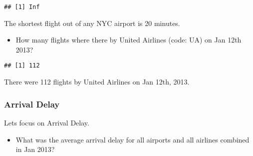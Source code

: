 \documentclass[
]{article}
\newenvironment{Shaded}{\begin{snugshade}}{\end{snugshade}}
\newcommand{\DataTypeTok}[1]{\textcolor[rgb]{0.13,0.29,0.53}{#1}}
\newcommand{\KeywordTok}[1]{\textcolor[rgb]{0.13,0.29,0.53}{\textbf{#1}}}
\newcommand{\NormalTok}[1]{#1}
\newcommand{\OperatorTok}[1]{\textcolor[rgb]{0.81,0.36,0.00}{\textbf{#1}}}
\newcommand{\OtherTok}[1]{\textcolor[rgb]{0.56,0.35,0.01}{#1}}
\newcommand{\StringTok}[1]{\textcolor[rgb]{0.31,0.60,0.02}{#1}}
\providecommand{\tightlist}{%
  \setlength{\itemsep}{0pt}\setlength{\parskip}{0pt}}
\begin{document}
\begin{verbatim}
## [1] Inf
\end{verbatim}

The shortest flight out of any NYC airport is 20 minutes.

\begin{itemize}
\tightlist
\item
  How many flights where there by United Airlines (code: UA) on Jan 12th
  2013?
\end{itemize}

\begin{Shaded}
\end{Shaded}

\begin{verbatim}
## [1] 112
\end{verbatim}

There were 112 flights by United Airlines on Jan 12th, 2013.

\hypertarget{arrival-delay}{%
\subsubsection{Arrival Delay}\label{arrival-delay}}

Lets focus on Arrival Delay.

\begin{itemize}
\tightlist
\item
  What was the average arrival delay for all airports and all airlines
  combined in Jan 2013?
\end{itemize}

\begin{Shaded}
\end{Shaded}
\end{document}
